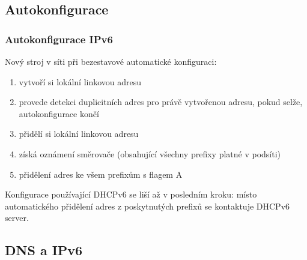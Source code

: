 \documentclass{beamer}
\begin{document}
\subsection{Autokonfigurace}
\begin{frame} \frametitle{Autokonfigurace IPv6}

Nový stroj v síti při bezestavové automatické konfiguraci:
\begin{enumerate}
\item vytvoří si lokální linkovou adresu
\item provede detekci duplicitních adres pro právě vytvořenou adresu, pokud selže, autokonfigurace končí
\item přidělí si lokální linkovou adresu
\item získá oznámení směrovače (obsahující všechny prefixy platné v podsíti)
\item přidělení adres ke všem prefixům s flagem A
\end{enumerate}

Konfigurace používající DHCPv6 se liší až v posledním kroku: místo automatického
přidělení adres z poskytnutých prefixů se kontaktuje DHCPv6 server.


\end{frame}

\subsection{DNS a IPv6}
\end{document}
